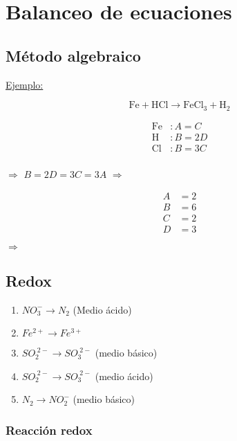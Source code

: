 \section{Balanceo de ecuaciones}


\subsection{Método algebraico}

\underline{Ejemplo:}

$$\text{Fe} + \text{HCl} \longrightarrow \text{FeCl}_3 + \text{H}_2$$

\begin{minipage}[l]{0.2\textwidth}
\begin{align*}
\text{Fe}&: A = C\\
\text{H}&: B = 2D\\
\text{Cl}&: B = 3C\\
\;
\end{align*}
\end{minipage}
$\Longrightarrow$
\hfil
$B=2D=3C=3A$
\hfil
$\Longrightarrow$
\begin{minipage}[l]{0.1\textwidth}
\begin{align*}
A&= 2\\
B&= 6\\
C&= 2\\
D&= 3
\end{align*}
\end{minipage}
$\Longrightarrow$
\hfil 
{}
\hfil


\subsection{Redox}

\begin{enumerate}
    \item $NO_3^- \rightarrow N_2$ (Medio ácido)
    \item $Fe^{2+} \rightarrow Fe^{3+}$
    \item $SO_2^{\;2-} \rightarrow SO_3^{\;2-}$ (medio básico)
    \item $SO_2^{\;2-} \rightarrow SO_3^{\;2-}$ (medio ácido)
    \item $N_2 \rightarrow NO_2^-$ (medio básico)
\end{enumerate}


\subsubsection*{Reacción redox}

